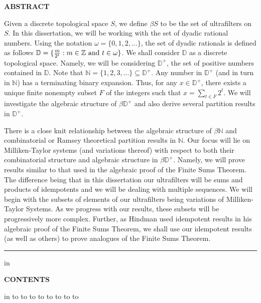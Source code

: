 \documentclass[12pt]{report}
\theoremstyle{definition}
\begin{document}
\newpage
\begin{center}
{\bf ABSTRACT}
\end{center}

Given a discrete topological space $S$, we define $\beta S$
to be the set of ultrafilters on $S$.  In this dissertation, we will
be working with the set of dyadic rational numbers.  
Using the notation $\omega = \{0,1,2,\ldots\}$, the set of 
dyadic rationals is defined as follows $\mathbb{D}
=\{{m \over 2^t}:m \in \mathbb{Z} \hbox{ and } t \in \omega\}$.
We shall consider $\mathbb{D}$ as a discrete topological space.  
Namely, we will be considering $\mathbb{D}^+$,
the set of positive numbers contained in $\mathbb{D}$. Note
that $\mathbb{N} = \{1,2,3,...\} \subseteq \mathbb{D}^+$. 
Any number in $\mathbb{D}^+$ (and in turn
in $\mathbb{N}$) has a terminating binary expansion.  Thus,
for any $x \in \mathbb{D}^+$, there exists a unique finite 
nonempty subset $F$ of the integers
such that $x=\sum_{t \in F} {2^t}$.  We will investigate the
algebraic structure of $\beta\mathbb{D}^+$ and also derive
several partition results in $\mathbb{D}^+$.


There is a close knit relationship between the algebraic 
structure of $\beta\mathbb{N}$ and combinatorial or Ramsey 
theoretical partition results in $\mathbb{N}$.  Our focus 
will lie on Milliken-Taylor systems (and variations thereof) 
with respect to both their combinatorial structure and 
algebraic structure in $\beta\mathbb{D}^+$.  Namely, we will
prove results similar to that used in the algebraic proof of
the Finite Sums Theorem.  The difference being that in this
dissertation our ultrafilters will be sums and products of
idempotents and we will be dealing with multiple sequences.  
We will begin with the subsets of elements of our ultrafilters 
being variations of Milliken-Taylor Systems.  As we progress
with our results, these subsets will be progressively more complex.
Further, as Hindman used idempotent results in his algebraic 
proof of the Finite Sums Theorem, we shall use our idempotent 
results (as well as others) to prove analogues of the Finite 
Sums Theorem. 

    



\newpage

\hrule height 0 pt depth 0 pt
 in
\begin{center}
{\bf \Large CONTENTS}
\end{center}
 in
\hbox to 
\bigskip
\hbox to 
\bigskip
\hbox to 
\bigskip
\hbox to 
\bigskip
\hbox to 
\bigskip
\hbox to 
\bigskip
\hbox to 
\bigskip
\hbox to 
\end{document}
